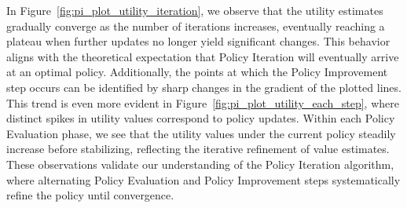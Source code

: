 \noindent In Figure~\ref{fig:pi_plot_utility_iteration}, we observe that the utility estimates gradually converge as the number of iterations increases, eventually reaching a plateau when further updates no longer yield significant changes. This behavior aligns with the theoretical expectation that Policy Iteration will eventually arrive at an optimal policy. Additionally, the points at which the Policy Improvement step occurs can be identified by sharp changes in the gradient of the plotted lines. This trend is even more evident in Figure~\ref{fig:pi_plot_utility_each_step}, where distinct spikes in utility values correspond to policy updates. Within each Policy Evaluation phase, we see that the utility values under the current policy steadily increase before stabilizing, reflecting the iterative refinement of value estimates. These observations validate our understanding of the Policy Iteration algorithm, where alternating Policy Evaluation and Policy Improvement steps systematically refine the policy until convergence.